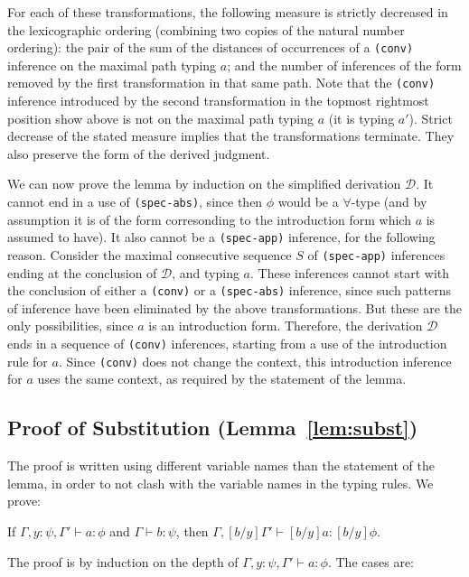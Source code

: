\documentclass[copyright]{eptcs}
\begin{document}
\noindent For each of these transformations, the following measure is
strictly decreased in the lexicographic ordering (combining two copies
of the natural number ordering): the pair of the sum of the distances
of occurrences of a \texttt{(conv)} inference on the maximal path
typing $a$; and the number of inferences of the form removed by the
first transformation in that same path.  Note that the \texttt{(conv)}
inference introduced by the second transformation in the topmost
rightmost position show above is not on the maximal path typing $a$
(it is typing $a'$).  Strict decrease of the stated measure implies
that the transformations terminate.  They also preserve the form of
the derived judgment.

We can now prove the lemma by induction on the simplified derivation
$\mathcal{D}$.  It cannot end in a use of \texttt{(spec-abs)}, since
then $\phi$ would be a $\forall$-type (and by assumption it is of the
form corresonding to the introduction form which $a$ is assumed to
have).  It also cannot be a \texttt{(spec-app)} inference, for the
following reason.  Consider the maximal consecutive sequence $S$ of
\texttt{(spec-app)} inferences ending at the conclusion of
$\mathcal{D}$, and typing $a$.  These inferences cannot start with the
conclusion of either a \texttt{(conv)} or a \texttt{(spec-abs)}
inference, since such patterns of inference have been eliminated by
the above transformations.  But these are the only possibilities, since
$a$ is an introduction form.  Therefore, the derivation $\mathcal{D}$
ends in a sequence of \texttt{(conv)} inferences, starting from a use
of the introduction rule for $a$.  Since \texttt{(conv)} does not change
the context, this introduction inference for $a$ uses the same context,
as required by the statement of the lemma.

\subsection{Proof of Substitution (Lemma~\ref{lem:subst})}
\label{sec:subst}

The proof is written using different variable names than the statement
of the lemma, in order to not clash with the variable names in the
typing rules. We prove:

If $\Gamma,y:\psi,\Gamma'\vdash a:\phi$ and $\Gamma\vdash b:\psi$,
then $\Gamma,[b/y]\Gamma'\vdash [b/y]a:[b/y]\phi$.

The proof is by induction on the depth of $\Gamma,y:\psi,\Gamma'\vdash a:\phi$. The cases are:
\end{document}
